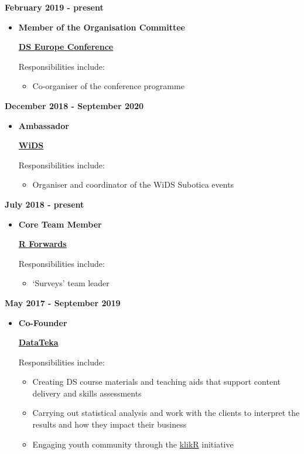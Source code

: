 \documentclass[
]{article}
\providecommand{\tightlist}{%
  \setlength{\itemsep}{0pt}\setlength{\parskip}{0pt}}
\begin{document}
\textbf{February 2019 - present}

\begin{itemize}
\item
  \textbf{Member of the Organisation Committee}

  \href{https://datasciconference.com/}{\textbf{DS Europe Conference}}

  Responsibilities include:

  \begin{itemize}
  \tightlist
  \item
    Co-organiser of the conference programme
  \end{itemize}
\end{itemize}

\textbf{December 2018 - September 2020}

\begin{itemize}
\item
  \textbf{Ambassador}

  \href{https://www.widsconference.org/}{\textbf{WiDS}}

  Responsibilities include:

  \begin{itemize}
  \tightlist
  \item
    Organiser and coordinator of the WiDS Subotica events
  \end{itemize}
\end{itemize}

\textbf{July 2018 - present}

\begin{itemize}
\item
  \textbf{Core Team Member}

  \href{https://forwards.github.io/}{\textbf{R Forwards}}

  Responsibilities include:

  \begin{itemize}
  \tightlist
  \item
    `Surveys' team leader
  \end{itemize}
\end{itemize}

\textbf{May 2017 - September 2019}

\begin{itemize}
\item
  \textbf{Co-Founder}

  \href{https://www.datateka.com}{\textbf{DataTeka}}

  Responsibilities include:

  \begin{itemize}
  \tightlist
  \item
    Creating DS course materials and teaching aids that support content
    delivery and skills assessments
  \item
    Carrying out statistical analysis and work with the clients to
    interpret the results and how they impact their business
  \item
    Engaging youth community through the
    \href{http://klikr.rbind.io}{klikR} initiative
  \end{itemize}
\end{itemize}
\end{document}
